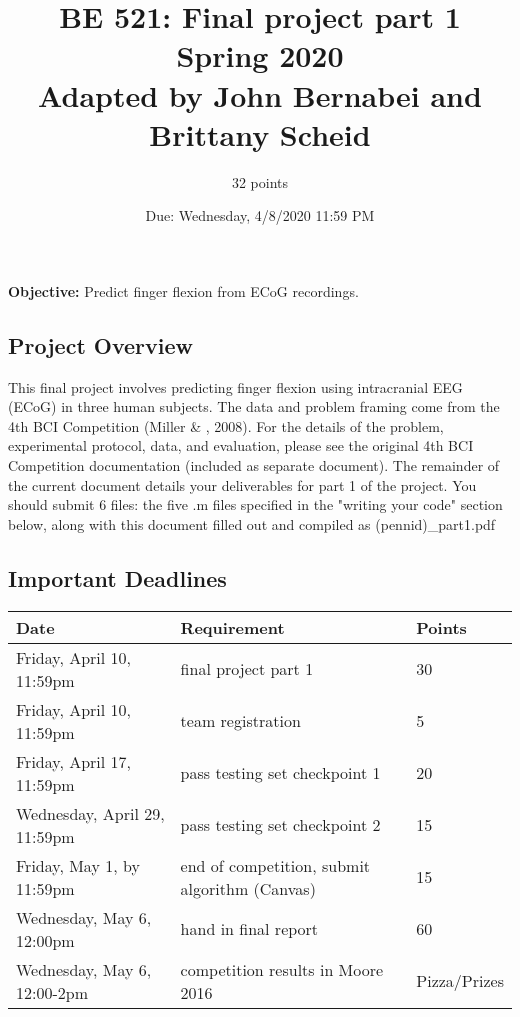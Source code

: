 \documentclass{article}
\begin{document}
    
    


\title{BE 521: Final project part 1 \\{\normalsize Spring 2020}
\\{\normalsize Adapted by John Bernabei and Brittany Scheid}}
\author{32 points}
\date{Due: Wednesday, 4/8/2020 11:59 PM}
\maketitle \textbf{Objective:} Predict finger flexion from ECoG recordings.

\subsection*{Project Overview}
This final project involves predicting finger flexion using intracranial EEG (ECoG) in three human subjects. The data and problem framing come from the 4th BCI Competition (Miller \& , 2008). For the details of the problem, experimental protocol, data, and evaluation, please see the original 4th BCI Competition documentation (included as separate document). The remainder of the current document details your deliverables for part 1 of the project.  You should submit 6 files: the five .m files specified in the "writing your code" section below, along with this document filled out and compiled as (pennid)\_part1.pdf 

\subsection*{Important Deadlines}
\begin{tabular}{ l|l|l } 
Date & Requirement & Points \\
\hline
Friday, April 10, 11:59pm & final project part 1 & 30 \\
Friday,    April 10, 11:59pm & team registration & 5 \\
Friday, April 17, 11:59pm & pass testing set checkpoint 1 & 20 \\
Wednesday, April 29, 11:59pm & pass testing set checkpoint 2 & 15 \\
Friday,    May 1, by 11:59pm & end of competition, submit algorithm (Canvas) & 15 \\
Wednesday, May 6, 12:00pm & hand in final report & 60 \\
Wednesday, May 6, 12:00-2pm & competition results in Moore 2016 & Pizza/Prizes \\
\end{tabular}
\end{document}
